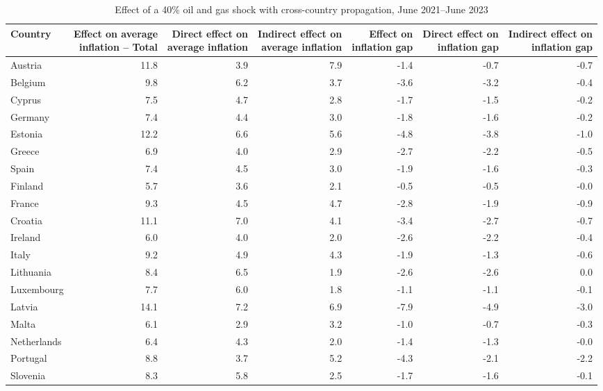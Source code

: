 \begin{table}[H]
\centering
\caption{Effect of a 40\% oil and gas shock with cross-country propagation, June 2021--June 2023}
\label{tab:shock-oil-gas-chain-ea20}
\scriptsize
\setlength{\tabcolsep}{1.2pt}
\begin{tabular}{lrrrrrr}
\toprule
Country & \shortstack{Effect on average\\inflation -- Total} & \shortstack{Direct effect on\\average inflation} & \shortstack{Indirect effect on\\average inflation} & \shortstack{Effect on\\inflation gap} & \shortstack{Direct effect on\\inflation gap} & \shortstack{Indirect effect on\\inflation gap}
 \\
\midrule
Austria & 11.8 & 3.9 & 7.9 & -1.4 & -0.7 & -0.7
 \\
Belgium & 9.8 & 6.2 & 3.7 & -3.6 & -3.2 & -0.4
 \\
Cyprus & 7.5 & 4.7 & 2.8 & -1.7 & -1.5 & -0.2
 \\
Germany & 7.4 & 4.4 & 3.0 & -1.8 & -1.6 & -0.2
 \\
Estonia & 12.2 & 6.6 & 5.6 & -4.8 & -3.8 & -1.0
 \\
Greece & 6.9 & 4.0 & 2.9 & -2.7 & -2.2 & -0.5
 \\
Spain & 7.4 & 4.5 & 3.0 & -1.9 & -1.6 & -0.3
 \\
Finland & 5.7 & 3.6 & 2.1 & -0.5 & -0.5 & -0.0
 \\
France & 9.3 & 4.5 & 4.7 & -2.8 & -1.9 & -0.9
 \\
Croatia & 11.1 & 7.0 & 4.1 & -3.4 & -2.7 & -0.7
 \\
Ireland & 6.0 & 4.0 & 2.0 & -2.6 & -2.2 & -0.4
 \\
Italy & 9.2 & 4.9 & 4.3 & -1.9 & -1.3 & -0.6
 \\
Lithuania & 8.4 & 6.5 & 1.9 & -2.6 & -2.6 & 0.0
 \\
Luxembourg & 7.7 & 6.0 & 1.8 & -1.1 & -1.1 & -0.1
 \\
Latvia & 14.1 & 7.2 & 6.9 & -7.9 & -4.9 & -3.0
 \\
Malta & 6.1 & 2.9 & 3.2 & -1.0 & -0.7 & -0.3
 \\
Netherlands & 6.4 & 4.3 & 2.0 & -1.4 & -1.3 & -0.0
 \\
Portugal & 8.8 & 3.7 & 5.2 & -4.3 & -2.1 & -2.2
 \\
Slovenia & 8.3 & 5.8 & 2.5 & -1.7 & -1.6 & -0.1

\end{tabular}
\end{table}
